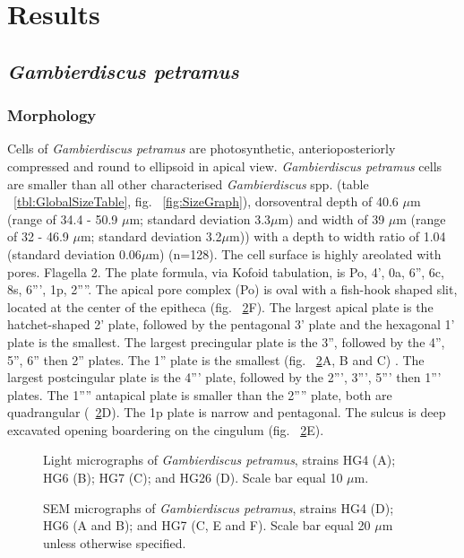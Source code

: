 \documentclass[12pt]{article}
\begin{document}
\section{Results}

\subsection{\emph{Gambierdiscus petramus}}
\subsubsection{Morphology}
Cells of \emph{Gambierdiscus petramus} are photosynthetic, anterioposteriorly compressed and round to ellipsoid in apical view. \emph{Gambierdiscus petramus} cells are smaller than all other characterised \emph{Gambierdiscus} spp. (table ~\ref{tbl:GlobalSizeTable}, fig. ~\ref{fig:SizeGraph}), dorsoventral depth of 40.6 $\mu$m (range of 34.4 - 50.9 $\mu$m; standard deviation 3.3$\mu$m) and width of 39 $\mu$m (range of 32 - 46.9 $\mu$m; standard deviation 3.2$\mu$m)) with a depth to width ratio of 1.04 (standard deviation 0.06$\mu$m)  (n=128). The cell surface is highly areolated with pores. Flagella 2. The plate formula, via Kofoid tabulation, is Po, 4', 0a, 6'', 6c, 8s, 6''', 1p, 2''''. 
The apical pore complex (Po) is oval with a fish-hook shaped slit, located at the center of the epitheca (fig. ~\ref{fig:PetSEM}F). The largest apical plate is the hatchet-shaped 2' plate, followed by the pentagonal 3' plate and the hexagonal 1' plate is the smallest. The largest precingular plate is the 3'', followed by the 4'', 5'', 6'' then 2'' plates. The 1'' plate is the smallest (fig. ~\ref{fig:PetSEM}A, B and C) . The largest postcingular plate is the 4''' plate, followed by the 2''', 3''', 5''' then 1''' plates. The 1'''' antapical plate is smaller than the 2'''' plate, both are quadrangular (~\ref{fig:PetSEM}D). The 1p plate is narrow and pentagonal. The sulcus is deep excavated opening boardering on the cingulum (fig. ~\ref{fig:PetSEM}E).



\FloatBarrier 
\begin{figure} 
\caption{Light micrographs of \emph{Gambierdiscus petramus}, strains HG4 (A); HG6 (B); HG7 (C); and HG26 (D). Scale bar equal 10 $\mu$m.​} 
\label{fig:PetLM}
\end{figure} 


\begin{figure} 
\caption{SEM micrographs of \emph{Gambierdiscus petramus}, strains HG4 (D); HG6 (A and B); and HG7 (C, E and F). Scale bar equal 20 $\mu$m unless otherwise specified.} 
\label{fig:PetSEM}
\end{figure} 
\FloatBarrier 
\end{document}
